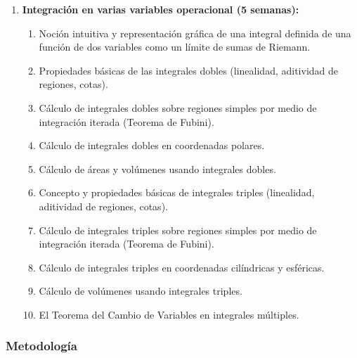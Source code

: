 \begin{refsection}
\begin{enumerate}
\item \textbf{Integración en varias variables operacional (5 semanas):}
\begin{enumerate}
    \item Noción intuitiva y representación gráfica de una integral definida de una función de dos variables como un límite de sumas de Riemann. 
    \item Propiedades básicas de las integrales dobles (linealidad, aditividad de regiones, cotas).
    \item Cálculo de integrales dobles sobre regiones simples  por medio de integración iterada (Teorema de Fubini).
    \item Cálculo de integrales dobles en coordenadas polares.
    \item Cálculo de áreas y volúmenes usando integrales dobles.
    \item Concepto y propiedades básicas de integrales triples (linealidad, aditividad de regiones, cotas).
    \item Cálculo de integrales triples sobre regiones simples  por medio de integración iterada (Teorema de Fubini).
    \item Cálculo de integrales triples en coordenadas cilíndricas y esféricas.
    \item Cálculo de volúmenes usando integrales triples.
    \item El Teorema del Cambio de Variables en integrales múltiples.
\end{enumerate}


\end{enumerate}

\subsubsection*{Metodología}


\end{refsection}
